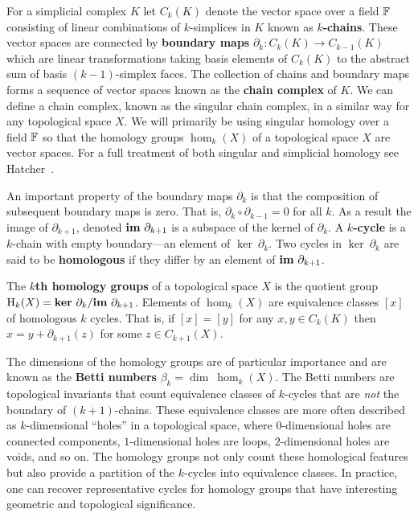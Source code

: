 
For a simplicial complex $K$ let $C_k(K)$ denote the vector space over a field $\mathbb{F}$ consisting of linear combinations of $k$-simplices in $K$ known as \textbf{$k$-chains}.
These vector spaces are connected by \textbf{boundary maps} $\partial_k: C_k(K)\to C_{k-1}(K)$ which are linear transformations taking basis elements of $C_k(K)$ to the abstract sum of basis $(k-1)$-simplex faces.
The collection of chains and boundary maps forms a sequence of vector spaces known as the \textbf{chain complex} of $K$.
We can define a chain complex, known as the singular chain complex, in a similar way for any topological space $X$.
We will primarily be using singular homology over a field $\mathbb{F}$ so that the homology groups $\hom_k(X)$ of a topological space $X$ are vector spaces.
For a full treatment of both singular and simplicial homology see Hatcher~\cite{hatcher01}.

An important property of the boundary maps $\partial_k$ is that the composition of subsequent boundary maps is zero.
That is, $\partial_k\circ\partial_{k-1} = 0$ for all $k$.
As a result the image of $\partial_{k+1}$, denoted $\mathbf{im}~\partial_{k+1}$ is a subspace of the kernel of $\partial_k$.
A \textbf{$k$-cycle} is a $k$-chain with empty boundary---an element of $\ker~\partial_k$.
Two cycles in $\ker~\partial_k$ are said to be \textbf{homologous} if they differ by an element of $\mathbf{im}~\partial_{k+1}$.

The \textbf{$k$th homology groups} of a topological space $X$ is the quotient group $\mathrm{H}_k(X) = \mathbf{ker}~\partial_k/\mathbf{im}~\partial_{k+1}$.
Elements of $\hom_k(X)$ are equivalence classes $[x]$ of homologous $k$ cycles.
That is, if $[x] = [y]$ for any $x,y\in C_k(K)$ then $x = y +\partial_{k+1}(z)$ for some $z\in C_{k+1}(X)$.

The dimensions of the homology groups are of particular importance and are known as the \textbf{Betti numbers} $\beta_k = \dim~\hom_k(X)$.
The Betti numbers are topological invariants that count equivalence classes of $k$-cycles that are \emph{not} the boundary of $(k+1)$-chains.
These equivalence classes are more often described as $k$-dimensional ``holes'' in a topological space, where $0$-dimensional holes are connected components, $1$-dimensional holes are loops, $2$-dimensional holes are voids, and so on.
The homology groups not only count these homological features but also provide a partition of the $k$-cycles into equivalence classes.
In practice, one can recover representative cycles for homology groups that have interesting geometric and topological significance.

